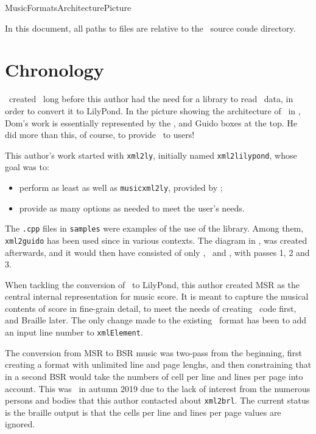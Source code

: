 {MusicFormatsArchitecturePicture}

In this document, all paths to files are relative to the \mf\ source coude directory.


\section{Chronology}

\fober\ created \libmusicxml\ long before this author had the need for a library to read \mxml\ data, in order to convert it to LilyPond.
In the picture showing the architecture of \mf\ in , Dom's work is essentially represented by the \mxml, \mxsrRepr and Guido boxes at the top. He did more than this, of course, to provide \libmusicxml\ to users!

This author's work started with {\tt xml2ly}, initially named {\tt xml2lilypond}, whose goal was to:
\begin{itemize}
\item perform as least as well as {\tt musicxml2ly}, provided by \lily;
\item provide as many options as needed to meet the user's needs.
\end{itemize}


The {\tt *.cpp} files in {\tt samples} were examples of the use of the library. Among them, {\tt xml2guido} has been used since in various contexts.
The diagram in , was created afterwards, and it would then have consisted of only \mxml, \mxsrRepr\ and \guido, with passes 1, 2 and 3.

When tackling the conversion of \mxml\ to LilyPond, this author created MSR as the central internal representation for music score. It is meant to capture the musical contents of score in fine-grain detail, to meet the needs of creating \lily\ code first, and Braille later.
The only change made to the existing \mxsrRepr\ format has been to add an input line number to {\tt xmlElement}.

The conversion from MSR to BSR music was two-pass from the beginning, first creating a \bsrRepr format with unlimited line and page lenghs, and then constraining that in a second BSR would take the numbers of cell per line and lines per page into account.
This was \frozen\ in autumn 2019 due to the lack of interest from the numerous persons and bodies that this author contacted about {\tt xml2brl}.
The current status is the braille output is that the cells per line and lines per page values are ignored.


